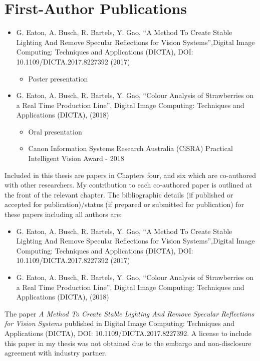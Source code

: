 \documentclass[fleqn,twoside,12pt]{report}
\begin{document}
\section{First-Author Publications}

\begin{itemize}
	\item{G. Eaton, A. Busch, R. Bartels, Y. Gao, “A Method To Create Stable Lighting And Remove Specular Reflections for Vision Systems”,Digital Image Computing: Techniques and Applications (DICTA), DOI: 10.1109/DICTA.2017.8227392 (2017)}
	\begin{itemize}
		\item Poster presentation 
	\end{itemize}
	\quad
	\item{G. Eaton, A. Busch, R. Bartels, Y. Gao, “Colour Analysis of Strawberries on a Real Time Production Line”, Digital Image Computing: Techniques and Applications (DICTA), (2018)}
	\begin{itemize}
		\item Oral presentation 
		\item Canon Information Systems Research Australia (CiSRA) Practical Intelligent Vision Award - 2018
	\end{itemize}
\end{itemize}  

Included in this thesis are papers in Chapters four, and six which are co-authored
with other researchers. My contribution to each co-authored paper is outlined at the front of
the relevant chapter. The bibliographic details (if published or accepted for publication)/status (if prepared or submitted for publication) for these papers including all authors are:

\begin{itemize}
	\item{G. Eaton, A. Busch, R. Bartels, Y. Gao, “A Method To Create Stable Lighting And Remove Specular Reflections for Vision Systems”,Digital Image Computing: Techniques and Applications (DICTA), DOI: 10.1109/DICTA.2017.8227392 (2017)}
	\quad
	\item{G. Eaton, A. Busch, R. Bartels, Y. Gao, “Colour Analysis of Strawberries on a Real Time Production Line”, Digital Image Computing: Techniques and Applications (DICTA), (2018)}
\end{itemize}  


The paper \textit{A Method To Create Stable Lighting And Remove Specular Reflections for Vision Systems} published in Digital Image Computing: Techniques and Applications (DICTA), DOI: 10.1109/DICTA.2017.8227392. A license to include this paper in my thesis was not obtained due to the embargo and non-disclosure agreement with industry partner.
\end{document}
